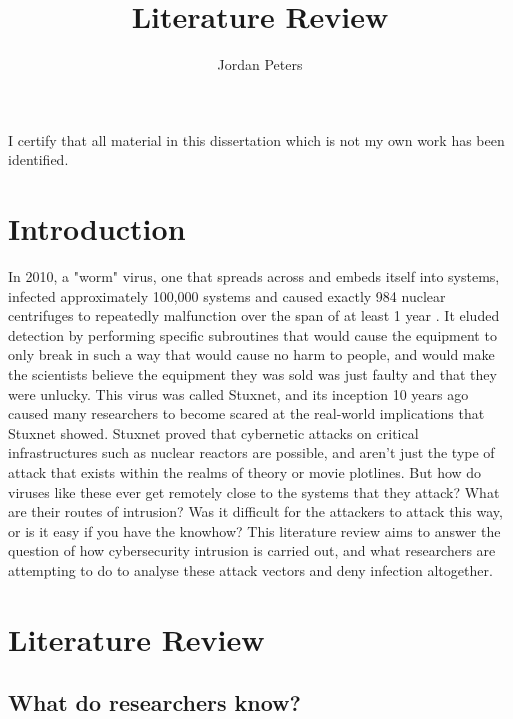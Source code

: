 \documentclass[a4paper, 11pt]{article}
\title{Literature Review}
\author{Jordan Peters}
\begin{document}
\begin{titlepage}
    \maketitle
    I certify that all material in this dissertation which is not my own work has been identified.
\end{titlepage}

\tableofcontents


\pagebreak


\section{Introduction}
In 2010, a "worm" virus, one that spreads across and embeds itself into systems, infected approximately 100,000 systems \cite{stuxnet2011report} and caused exactly 984 nuclear centrifuges to repeatedly malfunction \cite{singer2014cybersecurity} over the span of at least 1 year \cite{stuxnet2011report}. It eluded detection by performing specific subroutines that would cause the equipment to only break in such a way that would cause no harm to people, and would make the scientists believe the equipment they was sold was just faulty and that they were unlucky. \cite{singer2014cybersecurity} This virus was called Stuxnet, and its inception 10 years ago caused many researchers to become scared at the real-world implications that Stuxnet showed. \cite{stuxnet2011report}\cite{singer2014cybersecurity} Stuxnet proved that cybernetic attacks on critical infrastructures such as nuclear reactors are possible, and aren't just the type of attack that exists within the realms of theory or movie plotlines. \cite{stuxnet2011report} But how do viruses like these ever get remotely close to the systems that they attack? What are their routes of intrusion? Was it difficult for the attackers to attack this way, or is it easy if you have the knowhow? This literature review aims to answer the question of how cybersecurity intrusion is carried out, and what researchers are attempting to do to analyse these attack vectors and deny infection altogether.

\section{Literature Review}

\subsection{What do researchers know?}
\end{document}
